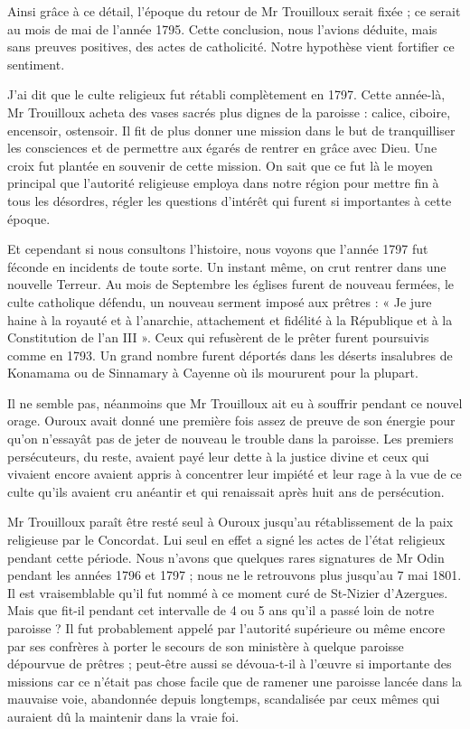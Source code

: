 Ainsi grâce à ce détail, l'époque du retour de Mr Trouilloux serait fixée ; ce serait au mois de mai de l'année 1795. Cette conclusion, nous l'avions déduite, mais sans preuves positives, des actes de catholicité. Notre hypothèse vient fortifier ce sentiment.

J'ai dit que le culte religieux fut rétabli complètement en 1797. Cette année-là, Mr Trouilloux acheta des vases sacrés plus dignes de la paroisse : calice, ciboire, encensoir, ostensoir. Il fit de plus donner une mission dans le but de tranquilliser les consciences et de permettre aux égarés de rentrer en grâce avec Dieu. Une croix fut plantée en souvenir de cette mission. On sait que ce fut là le moyen principal que l'autorité religieuse employa dans notre région pour mettre fin à tous les désordres, régler les questions d'intérêt qui furent si importantes à cette époque.

Et cependant si nous consultons l'histoire, nous voyons que l'année 1797 fut féconde en incidents de toute sorte. Un instant même, on crut rentrer dans une nouvelle Terreur. Au mois de Septembre les églises furent de nouveau fermées, le culte catholique défendu, un nouveau serment imposé aux prêtres : « Je jure haine à la royauté et à l'anarchie, attachement et fidélité à la République et à la Constitution de l'an III ». Ceux qui refusèrent de le prêter furent poursuivis comme en 1793. Un grand nombre furent déportés dans les déserts insalubres de Konamama ou de Sinnamary à Cayenne où ils moururent pour la plupart.

Il ne semble pas, néanmoins que Mr Trouilloux ait eu à souffrir pendant ce nouvel orage. Ouroux avait donné une première fois assez de preuve de son énergie pour qu'on n'essayât pas de jeter de nouveau le trouble dans la paroisse. Les premiers persécuteurs, du reste, avaient payé leur dette à la justice divine et ceux qui vivaient encore avaient appris à concentrer leur impiété et leur rage à la vue de ce culte qu'ils avaient cru anéantir et qui renaissait après huit ans de persécution.

Mr Trouilloux paraît être resté seul à Ouroux jusqu'au rétablissement de la paix religieuse par le Concordat. Lui seul en effet a signé les actes de l'état religieux pendant cette période. Nous n'avons que quelques rares signatures de Mr Odin pendant les années 1796 et 1797 ; nous ne le retrouvons plus jusqu'au 7 mai 1801. Il est vraisemblable qu'il fut nommé à ce moment curé de St-Nizier d'Azergues. Mais que fit-il pendant cet intervalle de 4 ou 5 ans qu'il a passé loin de notre paroisse ? Il fut probablement appelé par l'autorité supérieure ou même encore par ses confrères à porter le secours de son ministère à quelque paroisse dépourvue de prêtres ; peut-être aussi se dévoua-t-il à l'œuvre si importante des missions car ce n'était pas chose facile que de ramener une paroisse lancée dans la mauvaise voie, abandonnée depuis longtemps, scandalisée par ceux mêmes qui auraient dû la maintenir dans la vraie foi.

